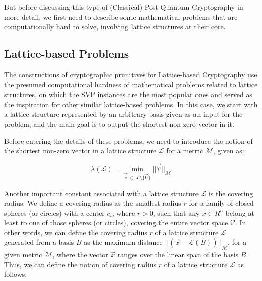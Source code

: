 \documentclass[runningheads]{llncs}
\numberwithin{equation}{section}
\begin{document}
    But before discussing this type of (Classical) Post-Quantum Cryptography in more detail, we first need to describe some mathematical problems that are computationally hard to solve, involving lattice structures at their core.
    
    \subsection{Lattice-based Problems}
    \label{subsec:lattice-based-problems}

    The constructions of cryptographic primitives for Lattice-based Cryptography use the presumed computational hardness of mathematical problems related to lattice structures, on which the SVP instances are the most popular ones and served as the inspiration for other similar lattice-based problems. In this case, we start with a lattice structure represented by an arbitrary basis given as an input for the problem, and the main goal is to output the shortest non-zero vector in it.\break

    \vspace{-2ex}
    
    \noindent Before entering the details of these problems, we need to introduce the notion of the shortest non-zero vector in a lattice structure $\mathcal{L}$ for a metric $\mathcal{M}$, given as:

    \begin{equation}
        \lambda(\mathcal{L}) = \min_{\Vec{\hat{v}}\ \in\ \mathcal{L} \setminus \{ \Vec{0} \} } {||\Vec{\hat{v}}||}_{\mathcal{M}}
        \label{equ:shortest-non-zero-vector-in-lattice}
    \end{equation}
    \vspace{1ex}

    \noindent
    
    \noindent Another important constant associated with a lattice structure $\mathcal{L}$ is the covering radius. We define a covering radius as the smallest radius $r$ for a family of closed spheres (or circles) with a center ${c}_{i}$, where $r > 0$, such that any $x \in {R}^{n}$ belong at least to one of those spheres (or circles), covering the entire vector space $\mathcal{V}$. In other words, we can define the covering radius $r$ of a lattice structure $\mathcal{L}$ generated from a basis $B$ as the maximum distance ${|| (\Vec{x} - \mathcal{L}(B) ) ||}_{\mathcal{M}}$, for a given metric $\mathcal{M}$, where the vector $\Vec{x}$ ranges over the linear span of the basis $B$. Thus, we can define the notion of covering radius $r$ of a lattice structure $\mathcal{L}$ as follows:
\end{document}
